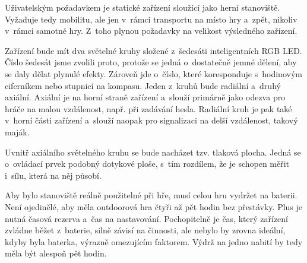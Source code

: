
Uživatelským požadavkem je statické zařízení sloužící jako herní stanoviště.
Vyžaduje tedy mobilitu, ale jen v~rámci transportu na místo hry a~zpět, nikoliv v~rámci samotné hry.
Z~toho plynou požadavky na velikost výsledného zařízení.

Zařízení bude mít dva světelné kruhy složené z~šedesáti inteligentních RGB LED.
Číslo šedesát jsme zvolili proto, protože se jedná o~dostatečně jemné dělení, aby se daly dělat plynulé efekty.
Zároveň jde o~číslo, které koresponduje s~hodinovým ciferníkem nebo stupnicí na kompasu.
Jeden z~kruhů bude radiální a~druhý axiální.
Axiální je na horní straně zařízení a~slouží primárně jako odezva pro hráče na malou vzdálenost, např. při zadávání hesla.
Radiální kruh je pak také v~horní části zařízení a~slouží naopak pro signalizaci na delší vzdálenost, takový maják.

Uvnitř axiálního světelného kruhu se bude nacházet tzv. tlaková plocha.
Jedná se o~ovládací prvek podobný dotykové ploše, s~tím rozdílem, že je schopen měřit i~sílu, která na něj působí.

Aby bylo stanoviště reálně použitelné při hře, musí celou hru vydržet na baterii.
Není ojedinělé, aby měla outdoorová hra čtyři až pět hodin bez přestávky.
Plus je nutná časová rezerva a~čas na nastavování.
Pochopitelně je čas, který zařízení zvládne běžet z~baterie, silně závisí na činnosti, ale nebylo by zrovna ideální, kdyby byla baterka, výrazně omezujícím faktorem.
Výdrž na jedno nabití by tedy měla být alespoň pět hodin.

